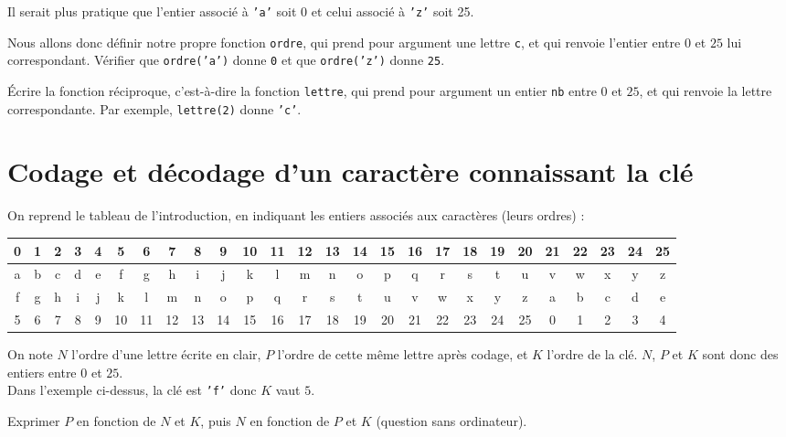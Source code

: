 Il serait plus pratique que l'entier associé à \texttt{'a'} soit $0$ et celui associé à \texttt{'z'} soit 25. 

\begin{question}
Nous allons donc définir notre propre fonction \texttt{ordre}, qui prend pour argument une lettre \texttt{c}, et qui renvoie l'entier entre $0$ et $25$ lui correspondant. Vérifier que \texttt{ordre('a')} donne \texttt{0} et que \texttt{ordre('z')} donne \texttt{25}.
\end{question}

\begin{question}
\'Ecrire la fonction réciproque, c'est-à-dire la fonction \texttt{lettre}, qui prend pour argument un entier \texttt{nb} entre $0$ et $25$, et qui renvoie la lettre correspondante. Par exemple, \texttt{lettre(2)} donne \texttt{'c'}.
\end{question}

\section{Codage et décodage d'un caractère connaissant la clé}


On reprend le tableau de l'introduction, en indiquant les entiers associés aux caractères (leurs ordres) :

\begin{table*}[h!]
\centering
\begin{tabular}{|*{26}{c|}}
\hline
0&1&2&3&4&5&6&7&8&9&10&11&12&13&14&15&16&17&18&19&20&21&22&23&24&25\\
\hline
a&b&c&d&e&f&g&h&i&j&k&l&m&n&o&p&q&r&s&t&u&v&w&x&y&z\\
\hline
f&g&h&i&j&k&l&m&n&o&p&q&r&s&t&u&v&w&x&y&z&a&b&c&d&e\\
\hline
5&6&7&8&9&10&11&12&13&14&15&16&17&18&19&20&21&22&23&24&25&0&1&2&3&4\\
\hline
\end{tabular}
\end{table*}
\bigskip
 On note $N$ l'ordre  d'une lettre écrite en clair, $P$ l'ordre  de cette même lettre après codage, et $K$ l'ordre de la clé. $N$, $P$ et $K$ sont donc des entiers entre $0$ et $25$.\\
 Dans l'exemple ci-dessus,  la clé est \texttt{'f'} donc $K$ vaut $5$.\\

\begin{question}
 Exprimer $P$ en fonction de $N$ et $K$, puis $N$ en fonction de $P$ et $K$ (question sans ordinateur).
\end{question}

